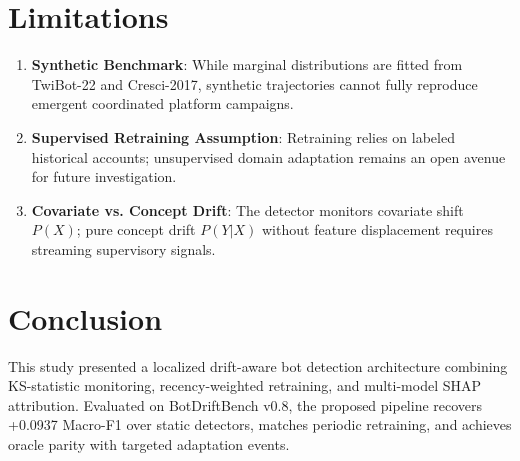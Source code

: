 \documentclass[journal]{IEEEtran}
\begin{document}
\section{Limitations}
\begin{enumerate}
    \item \textbf{Synthetic Benchmark}: While marginal distributions are fitted from TwiBot-22 and Cresci-2017, synthetic trajectories cannot fully reproduce emergent coordinated platform campaigns.
    \item \textbf{Supervised Retraining Assumption}: Retraining relies on labeled historical accounts; unsupervised domain adaptation remains an open avenue for future investigation.
    \item \textbf{Covariate vs. Concept Drift}: The detector monitors covariate shift $P(X)$; pure concept drift $P(Y|X)$ without feature displacement requires streaming supervisory signals.
\end{enumerate}

\section{Conclusion}
This study presented a localized drift-aware bot detection architecture combining KS-statistic monitoring, recency-weighted retraining, and multi-model SHAP attribution. Evaluated on BotDriftBench v0.8, the proposed pipeline recovers +0.0937 Macro-F1 over static detectors, matches periodic retraining, and achieves oracle parity with targeted adaptation events.



\end{document}
